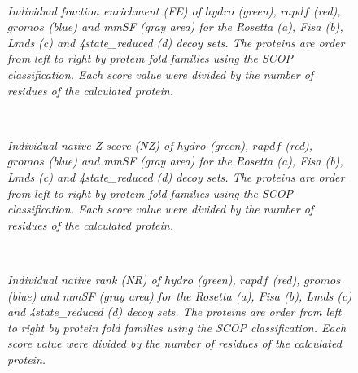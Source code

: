 \documentclass[a4paper,20pt,notitlepage,openbib]{article}
\begin{document}
\begin{figure}
\centering
\mbox{}
\mbox{  \quad
    \quad
    }
\caption{\label{trio_fe}\small\textit{Individual fraction enrichment (FE) of $hydro$ (green), $rapdf$ (red), $gromos$ (blue) and mmSF (gray area) for the Rosetta (a), Fisa (b), Lmds (c) and 4state\_reduced (d) decoy sets. The proteins are order from left to right by protein fold families using the SCOP \cite{scop} classification. Each score value were divided by the number of residues of the calculated protein.}}
\end{figure}
%
%
\begin{figure}
\centering
\mbox{}
\mbox{  \quad
    \quad
    }
\caption{\label{trio_nz}\small\textit{Individual native Z-score (NZ) of $hydro$ (green), $rapdf$ (red), $gromos$ (blue) and mmSF (gray area) for the Rosetta (a), Fisa (b), Lmds (c) and 4state\_reduced (d) decoy sets. The proteins are order from left to right by protein fold families using the SCOP \cite{scop} classification. Each score value were divided by the number of residues of the calculated protein.}}
\end{figure}
%
%
\begin{figure}
\centering
\mbox{}
\mbox{  \quad
    \quad
    }
\caption{\label{trio_nr}\small\textit{Individual native rank (NR) of $hydro$ (green), $rapdf$ (red), $gromos$ (blue) and mmSF (gray area) for the Rosetta (a), Fisa (b), Lmds (c) and 4state\_reduced (d) decoy sets. The proteins are order from left to right by protein fold families using the SCOP \cite{scop} classification. Each score value were divided by the number of residues of the calculated protein.}}
\end{figure}
\end{document}
